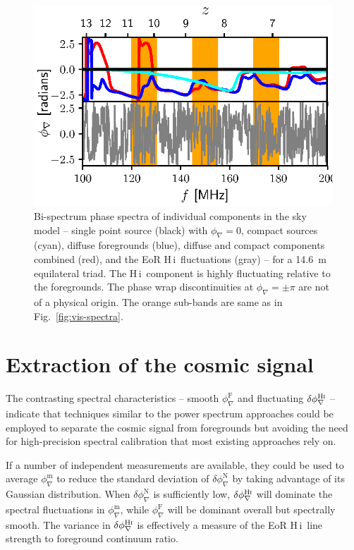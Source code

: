 \documentclass[
reprint,
superscriptaddress,
amsmath,
amssymb,
aps,
prd
]{revtex4-1}
\newcommand{\HI}{H\,{\sc i}}
\begin{document}
\begin{figure}[htb]
\includegraphics[width=\linewidth]{closure_phase_spectra_0_1_8}
\caption{Bi-spectrum phase spectra of individual components in the sky model -- single point source (black) with $\phi_\nabla=0$, compact sources (cyan), diffuse foregrounds (blue), diffuse and compact components combined (red), and the EoR \HI\ fluctuations (gray) -- for a 14.6~m equilateral triad. The \HI\ component is highly fluctuating relative to the foregrounds. The phase wrap discontinuities at $\phi_\nabla=\pm \pi$ are not of a physical origin. The orange sub-bands are same as in Fig.~\ref{fig:vis-spectra}. \label{fig:cp-spectra}}
\end{figure}

\section{Extraction of the cosmic signal}\label{sec:extraction}

The contrasting spectral characteristics -- smooth $\phi_\nabla^\textrm{F}$ and fluctuating $\delta\phi_\nabla^\textrm{H{\sc i}}$ -- indicate that techniques similar to the power spectrum approaches could be employed to separate the cosmic signal from foregrounds but avoiding the need for high-precision spectral calibration that most existing approaches rely on.

If a number of independent measurements are available, they could be used to average $\phi_\nabla^\textrm{m}$ to reduce the standard deviation of $\delta\phi_\nabla^\textrm{N}$ by taking advantage of its Gaussian distribution. When $\delta\phi_\nabla^\textrm{N}$ is sufficiently low, $\delta\phi_\nabla^\textrm{H{\sc i}}$ will dominate the spectral fluctuations in $\phi_\nabla^\textrm{m}$, while $\phi_\nabla^\textrm{F}$ will be dominant overall but spectrally smooth. The variance in $\delta\phi_\nabla^\textrm{H{\sc i}}$ is effectively a measure of the EoR \HI\ line strength to foreground continuum ratio.
\end{document}
